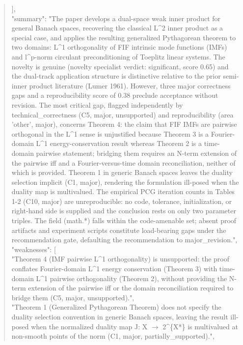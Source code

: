 \documentclass[11pt]{article}
\begin{document}
\begin{quote}
  ],\\
  "summary": "The paper develops a dual-space weak inner product for general Banach spaces, recovering the classical L\^{}2 inner product as a special case, and applies the resulting generalized Pythagorean theorem to two domains: L\^{}1 orthogonality of FIF intrinsic mode functions (IMFs) and l\^{}p-norm circulant preconditioning of Toeplitz linear systems. The novelty is genuine (novelty specialist verdict: significant, score 0.65) and the dual-track application structure is distinctive relative to the prior semi-inner product literature (Lumer 1961). However, three major correctness gaps and a reproducibility score of 0.38 preclude acceptance without revision. The most critical gap, flagged independently by technical\_correctness (C5, major, unsupported) and reproducibility (area 'other', major), concerns Theorem 4: the claim that FIF IMFs are pairwise orthogonal in the L\^{}1 sense is unjustified because Theorem 3 is a Fourier-domain L\^{}1 energy-conservation result whereas Theorem 2 is a time-domain pairwise statement; bridging them requires an N-term extension of the pairwise iff and a Fourier-versus-time domain reconciliation, neither of which is provided. Theorem 1 in generic Banach spaces leaves the duality selection implicit (C1, major), rendering the formulation ill-posed when the duality map is multivalued. The empirical PCG iteration counts in Tables 1-2 (C10, major) are unreproducible: no code, tolerance, initialization, or right-hand side is supplied and the conclusion rests on only two parameter triples. The field (math.*) falls within the code-amenable set; absent proof artifacts and experiment scripts constitute load-bearing gaps under the recommendation gate, defaulting the recommendation to major\_revision.",\\
  "weaknesses": [\\
    "Theorem 4 (IMF pairwise L\^{}1 orthogonality) is unsupported: the proof conflates Fourier-domain L\^{}1 energy conservation (Theorem 3) with time-domain L\^{}1 pairwise orthogonality (Theorem 2), without providing the N-term extension of the pairwise iff or the domain reconciliation required to bridge them (C5, major, unsupported).",\\
    "Theorem 1 (Generalized Pythagorean Theorem) does not specify the duality selection convention in generic Banach spaces, leaving the result ill-posed when the normalized duality map J: X \ensuremath{\to} 2\^{}\{X*\} is multivalued at non-smooth points of the norm (C1, major, partially\_supported).",\\

\end{quote}
\end{document}
